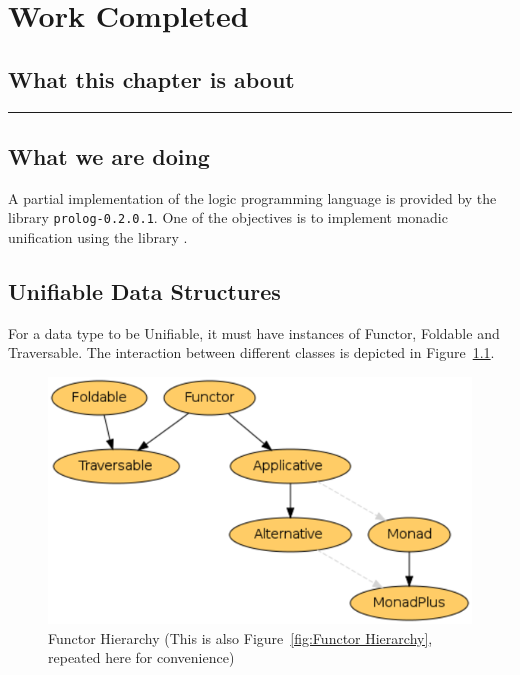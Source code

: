 \documentclass[thesis-solanki.tex]{subfiles}
\begin{document}
\chapter{Work Completed}\label{chap:workCompleted}


\section{What this chapter is about}

\noindent\rule{\textwidth}{0.5pt}


\section{What we are doing}
A partial implementation of the logic programming language  is provided by the library \texttt{prolog-0.2.0.1}. One of the 
objectives is to implement monadic unification using the library \cite{unification-fd-lib}. 


\section{Unifiable Data Structures}
For a data type to be Unifiable, it must have instances of Functor, Foldable and Traversable.
The interaction between different classes is depicted in Figure~\ref{fig:Functor Hierarchy Redux}.

\begin{figure}[th]
\centering
\includegraphics[scale = 0.7]{FunctorHierarchy.png}
\caption{Functor Hierarchy \cite{website:foldablenadtraversable}
(This is also Figure~\ref{fig:Functor Hierarchy}, repeated here for convenience)}
\label{fig:Functor Hierarchy Redux}
\end{figure}  
\end{document}
